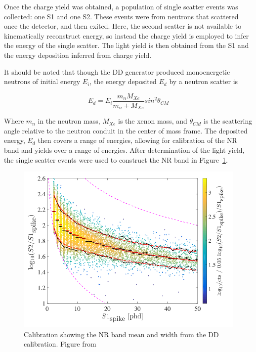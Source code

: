 Once the charge yield was obtained, a population of single scatter events was collected: one S1 and one S2. These events were from neutrons that scattered once the detector, and then exited. Here, the second scatter is not available to kinematically reconstruct energy, so instead the charge yield is employed to infer the energy of the single scatter. The light yield is then obtained from the S1 and the energy deposition inferred from charge yield. 

It should be noted that though the \ac{DD} generator produced monoenergetic neutrons of initial energy $E_{i}$, the energy deposited $E_{d}$ by a neutron scatter is

\begin{equation}
E_{d} = E_{i} \frac{m_{n} M_{Xe}}{m_{n} + M_{Xe}} sin^{2}\theta_{CM}
\end{equation}

Where $m_{n}$ in the neutron mass, $M_{Xe}$ is the xenon mass, and $\theta_{CM}$ is the scattering angle relative to the neutron conduit in the center of mass frame. The deposited energy, $E_{d}$ then covers a range of energies, allowing for calibration of the \ac{NR} band and yields over a range of energies. After determination of the light yield, the single scatter events were used to construct the \ac{NR} band in Figure~\ref{fig:lux_nrband}.

\begin{figure}[htbp]
\begin{center}
\includegraphics[width=\textwidth]{figures/lux/lux_nrband.png}
\caption{Calibration showing the \ac{NR} band mean and width from the \ac{DD} calibration. Figure from \cite{LUXDD}}
\label{fig:lux_nrband}
\end{center}
\end{figure}

